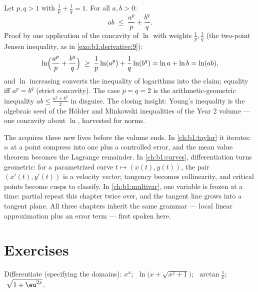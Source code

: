 \begin{example}\label{ex:b1:derivative:young}
Let $p, q > 1$ with $\frac1p + \frac1q = 1$. For all $a, b > 0$:
\[
ab \;\leq\; \frac{a^p}{p} + \frac{b^q}{q} .
\]
Proof by one application of the concavity of $\ln$ with weights
$\frac1p, \frac1q$ (the two-point Jensen inequality, as in
\cref{exo:b1:derivative:9}):
\[
\ln\Bigl(\frac{a^p}{p} + \frac{b^q}{q}\Bigr)
\;\geq\; \frac1p \ln(a^p) + \frac1q \ln(b^q)
= \ln a + \ln b = \ln(ab),
\]
and $\ln$ increasing converts the inequality of logarithms into
the claim; equality iff $a^p = b^q$ (strict concavity). The case
$p = q = 2$ is the arithmetic-geometric inequality $ab \leq
\frac{a^2 + b^2}{2}$ in disguise. The closing insight: Young's
inequality is the algebraic seed of the H\"older and Minkowski
inequalities of the Year 2 volume --- one concavity 
about $\ln$, harvested for norms.
\end{example}

\begin{remark}
The  acquires three new lives before the volume ends.
In \cref{ch:b1:taylor} it iterates: $n$  at a point
compress into one  plus a controlled error, and the
mean value theorem becomes the Lagrange remainder. In
\cref{ch:b1:curves}, differentiation turns geometric: for a
parametrized curve $t \mapsto (x(t), y(t))$, the pair $(x'(t),
y'(t))$ is a velocity \emph{vector}, tangency becomes
collinearity, and critical points become cusps to classify. In
\cref{ch:b1:multivar}, one variable is frozen at a time: partial
 repeat this chapter twice over, and the tangent line
grows into a tangent plane. All three chapters inherit the same
grammar --- local linear approximation plus an error term ---
first spoken here.
\end{remark}

\section{Exercises}

\begin{exercise}[$\star$]\label{exo:b1:derivative:1}
Differentiate (specifying the domains): $x^x$;
$\;\ln\bigl(x + \sqrt{x^2+1}\bigr)$; $\;\arctan\frac{1}{x}$;
$\;\sqrt{1 + \eu^{2x}}$.
\end{exercise}

